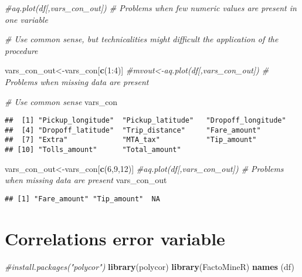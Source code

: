 \documentclass[]{article}
\newenvironment{Shaded}{\begin{snugshade}}{\end{snugshade}}
\newcommand{\KeywordTok}[1]{\textcolor[rgb]{0.13,0.29,0.53}{\textbf{{#1}}}}
\newcommand{\DecValTok}[1]{\textcolor[rgb]{0.00,0.00,0.81}{{#1}}}
\newcommand{\CommentTok}[1]{\textcolor[rgb]{0.56,0.35,0.01}{\textit{{#1}}}}
\newcommand{\NormalTok}[1]{{#1}}
\begin{document}
\begin{Shaded}
\begin{Highlighting}[]
\CommentTok{#aq.plot(df[,vars_con_out]) # Problems when few numeric values are present in one variable}

\CommentTok{# Use common sense, but technicalities might difficult the application of the procedure}

\NormalTok{vars_con_out<-vars_con[}\KeywordTok{c}\NormalTok{(}\DecValTok{1}\NormalTok{:}\DecValTok{4}\NormalTok{)]}
\CommentTok{#mvout<-aq.plot(df[,vars_con_out])  # Problems when missing data are present}

\CommentTok{# Use common sense}
\NormalTok{vars_con}
\end{Highlighting}
\end{Shaded}

\begin{verbatim}
##  [1] "Pickup_longitude"  "Pickup_latitude"   "Dropoff_longitude"
##  [4] "Dropoff_latitude"  "Trip_distance"     "Fare_amount"      
##  [7] "Extra"             "MTA_tax"           "Tip_amount"       
## [10] "Tolls_amount"      "Total_amount"
\end{verbatim}

\begin{Shaded}
\begin{Highlighting}[]
\NormalTok{vars_con_out<-vars_con[}\KeywordTok{c}\NormalTok{(}\DecValTok{6}\NormalTok{,}\DecValTok{9}\NormalTok{,}\DecValTok{12}\NormalTok{)]}
\CommentTok{#aq.plot(df[,vars_con_out])  # Problems when missing data are present}
\NormalTok{vars_con_out}
\end{Highlighting}
\end{Shaded}

\begin{verbatim}
## [1] "Fare_amount" "Tip_amount"  NA
\end{verbatim}

\section{Correlations error variable}\label{correlations-error-variable}

\begin{Shaded}
\begin{Highlighting}[]
\CommentTok{#install.packages("polycor")}
\KeywordTok{library}\NormalTok{(polycor)}
\KeywordTok{library}\NormalTok{(FactoMineR)}
\KeywordTok{names} \NormalTok{(df)}
\end{Highlighting}
\end{Shaded}
\end{document}
